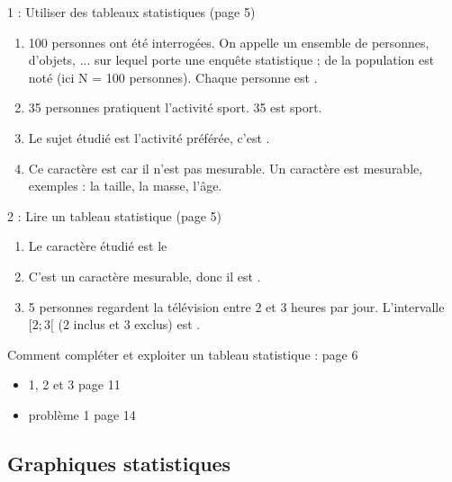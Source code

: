 \documentclass[12pt,a4paper]{article}
\begin{document}
\begin{myact}{1 : Utiliser des tableaux statistiques (page 5)}
	
	\begin{enumerate}[label=\alph*) ]
		\item 100 personnes ont été interrogées.
		On appelle  un ensemble de personnes, d'objets, ... sur lequel porte une enquête statistique ;  de la population est noté  (ici N = 100 personnes). Chaque personne est .
		
		\item 35 personnes pratiquent l'activité sport. 35 est  sport.
		
		\item Le sujet étudié est l'activité préférée, c'est . 
		
		\item Ce caractère est  car il n'est pas mesurable. Un caractère  est mesurable, exemples : la taille, la masse, l'âge.
	\end{enumerate}
\end{myact}


\begin{myact}{2 : Lire un tableau statistique (page 5)}
	\begin{enumerate}
		\item Le caractère étudié est le 
		\item C'est un caractère mesurable, donc il est .
		\item 5 personnes regardent la télévision entre 2 et 3 heures par jour. L'intervalle $[2;3[$ ($2$ inclus et $3$ exclus) est . 
	\end{enumerate}
\end{myact}

\begin{myapp}
	Comment compléter et exploiter un tableau statistique : page 6 
\end{myapp}

\begin{myexos}
	\begin{itemize}
		\item 1, 2 et 3 page 11
		\item problème 1 page 14
	\end{itemize}
	
\end{myexos}

\subsection{Graphiques statistiques}
%
%		
%
%	
%	
\end{document}
